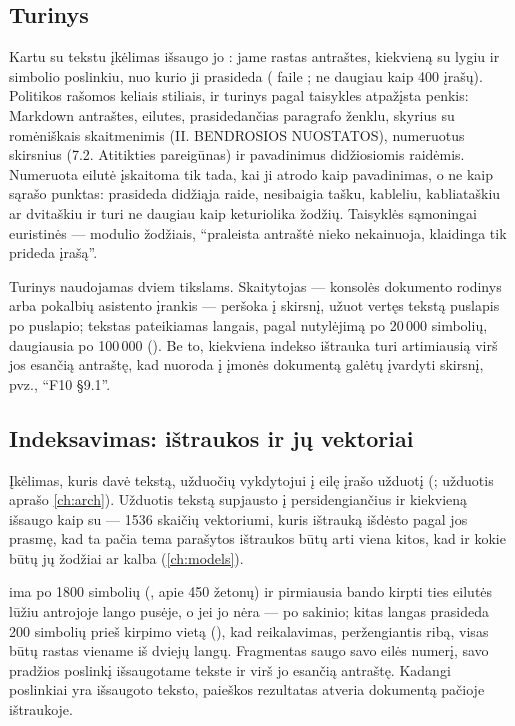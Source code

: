 \subsection{Turinys}\label{sec:company:outline}

Kartu su tekstu įkėlimas išsaugo jo : jame rastas antraštes, kiekvieną su lygiu ir
simbolio poslinkiu, nuo kurio ji prasideda ( faile
; ne daugiau kaip 400 įrašų). Politikos rašomos keliais stiliais, ir
turinys pagal taisykles atpažįsta penkis: Markdown antraštes, eilutes, prasidedančias paragrafo
ženklu, skyrius su romėniškais skaitmenimis (II. BENDROSIOS NUOSTATOS), numeruotus skirsnius
(7.2. Atitikties pareigūnas) ir pavadinimus didžiosiomis raidėmis. Numeruota eilutė įskaitoma
tik tada, kai ji atrodo kaip pavadinimas, o ne kaip sąrašo punktas: prasideda didžiąja raide,
nesibaigia tašku, kableliu, kabliataškiu ar dvitaškiu ir turi ne daugiau kaip keturiolika
žodžių. Taisyklės sąmoningai euristinės --- modulio žodžiais, \enquote{praleista antraštė
nieko nekainuoja, klaidinga tik prideda įrašą}.

Turinys naudojamas dviem tikslams. Skaitytojas --- konsolės dokumento rodinys arba pokalbių
asistento įrankis  --- peršoka į skirsnį, užuot vertęs tekstą puslapis po
puslapio; tekstas pateikiamas langais, pagal nutylėjimą po 20\,000 simbolių, daugiausia po
100\,000 (). Be to, kiekviena indekso ištrauka turi
artimiausią virš jos esančią antraštę, kad nuoroda į įmonės dokumentą galėtų įvardyti skirsnį,
pvz., \enquote{F10 §9.1}.

\subsection{Indeksavimas: ištraukos ir jų vektoriai}\label{sec:company:indexing}

Įkėlimas, kuris davė tekstą, užduočių vykdytojui į eilę įrašo užduotį 
(; užduotis aprašo \cref{ch:arch}). Užduotis tekstą supjausto į
persidengiančius  ir kiekvieną išsaugo kaip  su 
--- 1536 skaičių vektoriumi, kuris ištrauką išdėsto pagal jos prasmę, kad ta pačia tema
parašytos ištraukos būtų arti viena kitos, kad ir kokie būtų jų žodžiai ar kalba
(\cref{ch:models}).

 ima po 1800 simbolių (, apie 450 žetonų) ir pirmiausia
bando kirpti ties eilutės lūžiu antrojoje lango pusėje, o jei jo nėra --- po sakinio; kitas
langas prasideda 200 simbolių prieš kirpimo vietą (), kad reikalavimas,
peržengiantis ribą, visas būtų rastas viename iš dviejų langų. Fragmentas saugo savo eilės
numerį, savo pradžios poslinkį išsaugotame tekste ir virš jo esančią antraštę. Kadangi
poslinkiai yra išsaugoto teksto, paieškos rezultatas atveria dokumentą pačioje ištraukoje.

